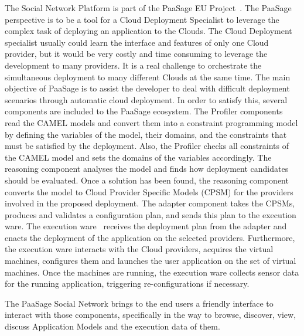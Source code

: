 The Social Network Platform is part of the PaaSage EU Project~\cite{paasage}.
The PaaSage perspective is to be a tool for a Cloud Deployment Specialist to leverage the complex task of deploying an application to the Clouds. The Cloud Deployment specialist usually could learn the interface and features of only one Cloud provider, but it would be very costly and time consuming to leverage the development to many providers. It is a real challenge to orchestrate the simultaneous deployment to many different Clouds at the same time. The main objective of PaaSage is to assist the developer to deal with difficult deployment scenarios through automatic cloud deployment. In order to satisfy this, several components are included to the PaaSage ecosystem. The Profiler components read the CAMEL models and convert them into a constraint programming model by defining the variables of the model, their domains, and the constraints that must be satisfied by the deployment. Also, the Profiler checks all constraints of the CAMEL model and sets the domains of the variables accordingly. The reasoning component analyses the model and finds how deployment candidates should be evaluated. Once a solution has been found, the reasoning component converts the model to Cloud Provider Specific Models (CPSM) for the providers involved in the proposed deployment. The adapter component takes the CPSMs, produces and validates a configuration plan, and sends this plan to the execution ware. The execution ware~\cite{baur2014towards} receives the deployment plan from the adapter and enacts the deployment of the application on the selected providers. Furthermore, the execution ware interacts with the Cloud providers, acquires the virtual machines, configures them and launches the user application on the set of virtual machines. Once the machines are running, the execution ware collects sensor data for the running application, triggering re-configurations if necessary.

The PaaSage Social Network brings to the end users a friendly interface to interact with those components, specifically in the way to browse, discover, view, discuss Application Models and the execution data of them.



